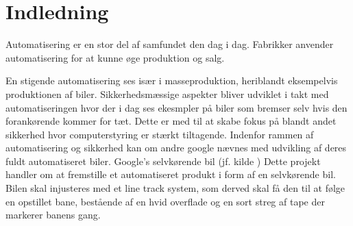 \section{Indledning}

Automatisering er en stor del af samfundet den dag i dag. Fabrikker anvender automatisering for at kunne øge produktion og salg.

En stigende automatisering ses især i masseproduktion, heriblandt eksempelvis produktionen af biler. \newline
Sikkerhedsmæssige aspekter bliver udviklet i takt med automatiseringen hvor der i dag ses ekesmpler på biler som bremser selv hvis den forankørende kommer for tæt. 
Dette er med til at skabe fokus på blandt andet sikkerhed hvor computerstyring er stærkt tiltagende. Indenfor rammen af automatisering og sikkerhed kan om andre google nævnes med udvikling af deres fuldt automatiseret biler. 
Google's selvkørende bil (jf. kilde \cite{googlebil})
\newline
\newline
Dette projekt handler om at fremstille et automatiseret produkt i form af en selvkørende bil. Bilen skal injusteres med et line track system, som derved skal få den til at følge en opstillet bane, bestående af en hvid overflade og en sort streg af tape der markerer banens gang.\newline
